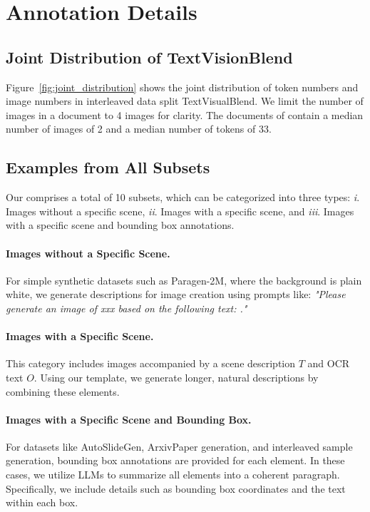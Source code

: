 


\section{Annotation Details}




\subsection{Joint Distribution of TextVisionBlend} Figure~\ref{fig:joint_distribution} shows the joint distribution of token numbers and image numbers in interleaved data split TextVisualBlend. 
We limit the number of images in a document to 4 images for clarity. 
The documents of \DatasetName contain a median number of images of 2 and a median number of tokens of 33.


\subsection{Examples from All Subsets}

Our \DatasetName comprises a total of 10 subsets, which can be categorized into three types: \emph{i}. Images without a specific scene, \emph{ii}. Images with a specific scene, and \emph{iii}. Images with a specific scene and bounding box annotations.

\paragraph{Images without a Specific Scene.}
For simple synthetic datasets such as Paragen-2M, where the background is plain white, we generate descriptions for image creation using prompts like: \textit{"Please generate an image of xxx based on the following text: ."}

\paragraph{Images with a Specific Scene.}
This category includes images accompanied by a scene description $T$ and OCR text $O$. Using our template, we generate longer, natural descriptions by combining these elements.

\paragraph{Images with a Specific Scene and Bounding Box.}
For datasets like AutoSlideGen, ArxivPaper generation, and interleaved sample generation, bounding box annotations are provided for each element. In these cases, we utilize LLMs to summarize all elements into a coherent paragraph. Specifically, we include details such as bounding box coordinates and the text within each box.

